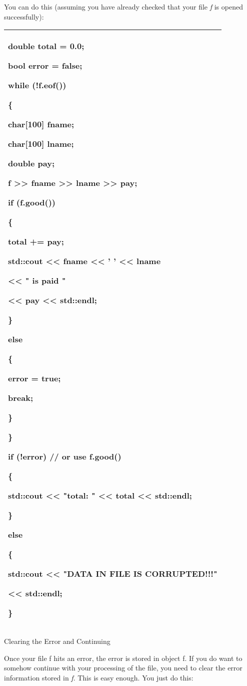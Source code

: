 \documentclass[
]{article}
\begin{document}
You can do this (assuming you have already checked that your file
\emph{f} is opened successfully):

\begin{longtable}[]{@{}l@{}}
\toprule
\endhead
\begin{minipage}[t]{0.97\columnwidth}\raggedright
double total = 0.0;

bool error = false;

while (!f.eof())

\{

char{[}100{]} fname;

char{[}100{]} lname;

double pay;

f \textgreater\textgreater{} fname \textgreater\textgreater{} lname
\textgreater\textgreater{} pay;

if (f.good())

\{

total += pay;

std::cout \textless\textless{} fname \textless\textless{} ' '
\textless\textless{} lname

\textless\textless{} " is paid "

\textless\textless{} pay \textless\textless{} std::endl;

\}

else

\{

error = true;

break;

\}

\}

if (!error) // or use f.good()

\{

std::cout \textless\textless{} "total: " \textless\textless{} total
\textless\textless{} std::endl;

\}

else

\{

std::cout \textless\textless{} "DATA IN FILE IS CORRUPTED!!!"

\textless\textless{} std::endl;

\}\strut
\end{minipage}\tabularnewline
\bottomrule
\end{longtable}

Clearing the Error and Continuing

Once your file f hits an error, the error is stored in object f. If you
do want to somehow continue with your processing of the file, you need
to clear the error information stored in \emph{f}. This is easy enough.
You just do this:
\end{document}
